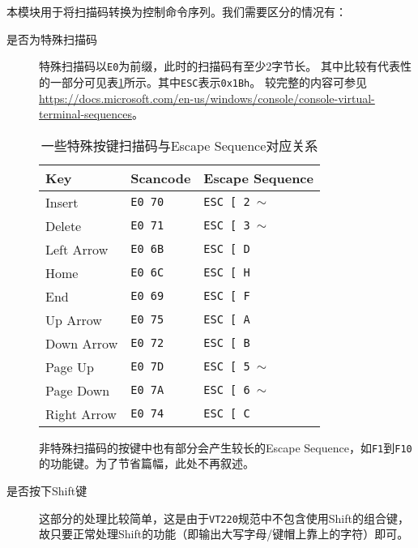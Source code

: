  本模块用于将扫描码转换为控制命令序列。我们需要区分的情况有：
 \begin{description}
    \item[是否为特殊扫描码] 特殊扫描码以\texttt{E0}为前缀，此时的扫描码有至少2字节长。
    其中比较有代表性的一部分可见表\ref{tab:scancode_to_text}所示。其中\texttt{ESC}表示\texttt{0x1Bh}。
    较完整的内容可参见 \url{https://docs.microsoft.com/en-us/windows/console/console-virtual-terminal-sequences}。

    \begin{table}[htbp]
        \centering
        \caption{一些特殊按键扫描码与Escape Sequence对应关系}
        \label{tab:scancode_to_text}
        \begin{tabular}{|l|l|l|}
        \hline
        \textbf{Key}   & \textbf{Scancode} & \textbf{Escape Sequence}   \\ \hline
        Insert         & \texttt{E0 70}    & \texttt{ESC {[} 2 $\sim$}  \\ \hline
        Delete         & \texttt{E0 71}    & \texttt{ESC {[} 3 $\sim$}  \\ \hline
        Left Arrow     & \texttt{E0 6B}    & \texttt{ESC {[} D       }  \\ \hline
        Home           & \texttt{E0 6C}    & \texttt{ESC {[} H       }  \\ \hline
        End            & \texttt{E0 69}    & \texttt{ESC {[} F       }  \\ \hline
        Up Arrow       & \texttt{E0 75}    & \texttt{ESC {[} A       }  \\ \hline
        Down Arrow     & \texttt{E0 72}    & \texttt{ESC {[} B       }  \\ \hline
        Page Up        & \texttt{E0 7D}    & \texttt{ESC {[} 5 $\sim$}  \\ \hline
        Page Down      & \texttt{E0 7A}    & \texttt{ESC {[} 6 $\sim$}  \\ \hline
        Right Arrow    & \texttt{E0 74}    & \texttt{ESC {[} C       }  \\ \hline
        \end{tabular}
    \end{table}

    非特殊扫描码的按键中也有部分会产生较长的Escape Sequence，如\texttt{F1}到\texttt{F10}的功能键。为了节省篇幅，此处不再叙述。

    \item[是否按下Shift键] 这部分的处理比较简单，这是由于\texttt{VT220}规范中不包含使用Shift的组合键，故只要正常处理Shift的功能（即输出大写字母/键帽上靠上的字符）即可。


\end{description}
